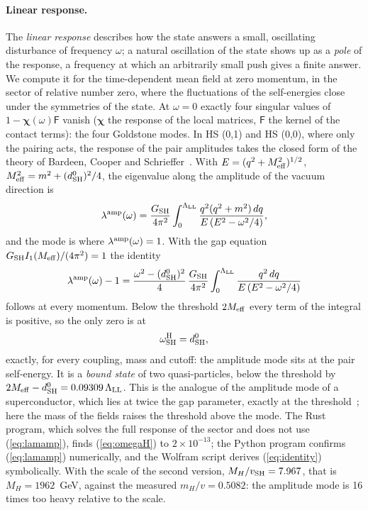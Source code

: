 \documentclass[aps,prd,twocolumn,superscriptaddress,nofootinbib,floatfix,longbibliography]{revtex4-2}
\newcommand{\LL}{{\rm LL}}
\newcommand{\SH}{{\rm SH}}
\begin{document}
\paragraph*{Linear response.}
The \emph{linear response} describes how the state answers a small, oscillating disturbance of frequency $\omega$; a
natural oscillation of the state shows up as a \emph{pole} of the response, a frequency at which an arbitrarily small
push gives a finite answer. We compute it for the time-dependent mean field at zero momentum, in the sector of relative
number zero, where the fluctuations of the self-energies close under the symmetries of the state. At $\omega=0$ exactly
four singular values of $1-\bm\chi(\omega)\mathsf F$ vanish ($\bm\chi$ the response of the local matrices, $\mathsf F$
the kernel of the contact terms): the four Goldstone modes. In HS (0,1) and HS (0,0), where only the pairing acts, the
response of the pair amplitudes takes the closed form of the theory of Bardeen, Cooper and Schrieffer~\cite{BCS1957}.
With $E=(q^2+M_{\rm eff}^2)^{1/2}$, $M_{\rm eff}^2=m^2+(d^0_\SH)^2/4$, the eigenvalue along the amplitude of the vacuum
direction is
\begin{equation}
\lambda^{\rm amp}(\omega)=\frac{G_\SH}{4\pi^2}\int_0^{\Lambda_\LL}\frac{q^2(q^2+m^2)\,dq}{E\,(E^2-\omega^2/4)} ,
\label{eq:lamamp}
\end{equation}
and the mode is where $\lambda^{\rm amp}(\omega)=1$. With the gap equation $G_\SH I_1(M_{\rm eff})/(4\pi^2)=1$ the identity
\begin{equation}
\lambda^{\rm amp}(\omega)-1=\frac{\omega^2-(d^0_\SH)^2}{4}\,\frac{G_\SH}{4\pi^2}\int_0^{\Lambda_\LL}\frac{q^2\,dq}{E\,(E^2-\omega^2/4)}
\label{eq:identity}
\end{equation}
follows at every momentum. Below the threshold $2M_{\rm eff}$ every term of the integral is positive, so the only zero
is at
\begin{equation}
\omega^{\rm H}_\SH=d^0_\SH ,
\label{eq:omegaH}
\end{equation}
exactly, for every coupling, mass and cutoff: the amplitude mode sits at the pair self-energy. It is a \emph{bound state}
of two quasi-particles, below the threshold by $2M_{\rm eff}-d^0_\SH=0.09309\,\Lambda_\LL$. This is the analogue of the
amplitude mode of a superconductor, which lies at twice the gap parameter, exactly at the
threshold~\cite{LittlewoodVarma1981,PekkerVarma2015}; here the mass of the fields raises the threshold above the mode. The Rust program, which solves the
full response of the sector and does not use (\ref{eq:lamamp}), finds (\ref{eq:omegaH}) to \ensuremath{2\times10^{-13}}; the Python
program confirms (\ref{eq:lamamp}) numerically, and the Wolfram script derives (\ref{eq:identity}) symbolically. With the
scale of the second version, $M_H/v_\SH=7.967$, that is $M_H=1962$~GeV, against the measured
$m_H/v=0.5082$: the amplitude mode is 16 times too heavy relative to the scale.
\end{document}
